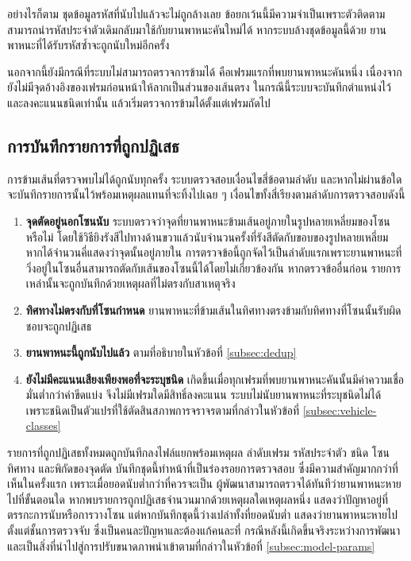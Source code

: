 อย่างไรก็ตาม ชุดข้อมูลรหัสที่นับไปแล้วจะไม่ถูกล้างเลย  ข้อยกเว้นนี้มีความจำเป็นเพราะตัวติดตามสามารถนำรหัสประจำตัวเดิมกลับมาใช้กับยานพาหนะคันใหม่ได้ หากระบบล้างชุดข้อมูลนี้ด้วย ยานพาหนะที่ได้รับรหัสซ้ำจะถูกนับใหม่อีกครั้ง

นอกจากนี้ยังมีกรณีที่ระบบไม่สามารถตรวจการข้ามได้ คือเฟรมแรกที่พบยานพาหนะคันหนึ่ง เนื่องจากยังไม่มีจุดอ้างอิงของเฟรมก่อนหน้าให้ลากเป็นส่วนของเส้นตรง ในกรณีนี้ระบบจะบันทึกตำแหน่งไว้และลงคะแนนชนิดเท่านั้น แล้วเริ่มตรวจการข้ามได้ตั้งแต่เฟรมถัดไป

\subsection{การบันทึกรายการที่ถูกปฏิเสธ}
\label{subsec:rejection-log}

การข้ามเส้นที่ตรวจพบไม่ได้ถูกนับทุกครั้ง ระบบตรวจสอบเงื่อนไขสี่ข้อตามลำดับ และหากไม่ผ่านข้อใด จะบันทึกรายการนั้นไว้พร้อมเหตุผลแทนที่จะทิ้งไปเฉย ๆ เงื่อนไขทั้งสี่เรียงตามลำดับการตรวจสอบดังนี้

\begin{enumerate}
    \item \textbf{จุดตัดอยู่นอกโซนนับ} ระบบตรวจว่าจุดที่ยานพาหนะข้ามเส้นอยู่ภายในรูปหลายเหลี่ยมของโซนหรือไม่ โดยใช้วิธียิงรังสีไปทางด้านขวาแล้วนับจำนวนครั้งที่รังสีตัดกับขอบของรูปหลายเหลี่ยม หากได้จำนวนคี่แสดงว่าจุดนั้นอยู่ภายใน  การตรวจข้อนี้ถูกจัดไว้เป็นลำดับแรกเพราะยานพาหนะที่วิ่งอยู่ในโซนอื่นสามารถตัดกับเส้นของโซนนี้ได้โดยไม่เกี่ยวข้องกัน หากตรวจข้ออื่นก่อน รายการเหล่านั้นจะถูกบันทึกด้วยเหตุผลที่ไม่ตรงกับสาเหตุจริง
    \item \textbf{ทิศทางไม่ตรงกับที่โซนกำหนด} ยานพาหนะที่ข้ามเส้นในทิศทางตรงข้ามกับทิศทางที่โซนนั้นรับผิดชอบจะถูกปฏิเสธ
    \item \textbf{ยานพาหนะนี้ถูกนับไปแล้ว} ตามที่อธิบายในหัวข้อที่ \ref{subsec:dedup}
    \item \textbf{ยังไม่มีคะแนนเสียงเพียงพอที่จะระบุชนิด} เกิดขึ้นเมื่อทุกเฟรมที่พบยานพาหนะคันนั้นมีค่าความเชื่อมั่นต่ำกว่าค่าขีดแบ่ง จึงไม่มีเฟรมใดมีสิทธิ์ลงคะแนน ระบบไม่นับยานพาหนะที่ระบุชนิดไม่ได้ เพราะชนิดเป็นตัวแปรที่ใช้ตัดสินสภาพการจราจรตามที่กล่าวในหัวข้อที่ \ref{subsec:vehicle-classes}
\end{enumerate}

รายการที่ถูกปฏิเสธทั้งหมดถูกบันทึกลงไฟล์แยกพร้อมเหตุผล ลำดับเฟรม รหัสประจำตัว ชนิด โซน ทิศทาง และพิกัดของจุดตัด  บันทึกชุดนี้ทำหน้าที่เป็นร่องรอยการตรวจสอบ ซึ่งมีความสำคัญมากกว่าที่เห็นในครั้งแรก เพราะเมื่อยอดนับต่ำกว่าที่ควรจะเป็น ผู้พัฒนาสามารถตรวจได้ทันทีว่ายานพาหนะหายไปที่ขั้นตอนใด  หากพบรายการถูกปฏิเสธจำนวนมากด้วยเหตุผลใดเหตุผลหนึ่ง แสดงว่าปัญหาอยู่ที่ตรรกะการนับหรือการวางโซน แต่หากบันทึกชุดนี้ว่างเปล่าทั้งที่ยอดนับต่ำ แสดงว่ายานพาหนะหายไปตั้งแต่ชั้นการตรวจจับ ซึ่งเป็นคนละปัญหาและต้องแก้คนละที่  กรณีหลังนี้เกิดขึ้นจริงระหว่างการพัฒนา และเป็นสิ่งที่นำไปสู่การปรับขนาดภาพนำเข้าตามที่กล่าวในหัวข้อที่ \ref{subsec:model-params}

